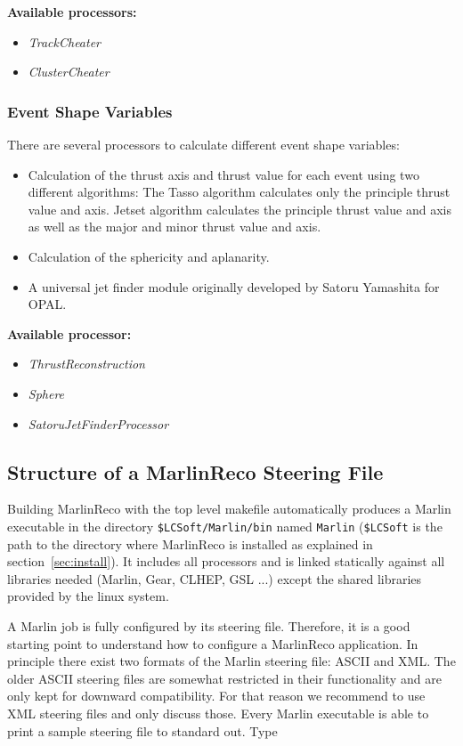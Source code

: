 {\bf Available processors:}
\begin{itemize}
\item {\em TrackCheater}
\item {\em ClusterCheater}
\end{itemize}

\subsubsection{Event Shape Variables}

There are several processors to calculate different event shape variables:

\begin{itemize}
\item Calculation of the thrust axis and thrust value for each event using two
      different algorithms:
      The Tasso algorithm calculates only the principle thrust value and axis.
      Jetset algorithm calculates the principle thrust value and axis
      as well as the major and minor thrust value and axis.
\item Calculation of the sphericity and aplanarity.
\item A universal jet finder module originally developed by Satoru Yamashita for
   OPAL.
\end{itemize}

{\bf Available processor:}
\begin{itemize}
\item {\em ThrustReconstruction}
\item {\em Sphere}
\item {\em SatoruJetFinderProcessor}
\end{itemize}

\subsection{Structure of a MarlinReco Steering File}

Building MarlinReco with the top level makefile automatically produces a
Marlin executable in the directory {\tt \$LCSoft/Marlin/bin} named
{\tt Marlin}
({\tt \$LCSoft} is the path to the directory where MarlinReco is installed as
explained in section~\ref{sec:install}).
It includes all processors and is linked statically against all
libraries needed (Marlin, Gear, CLHEP, GSL ...) except the shared libraries
provided by the linux system.

A Marlin job is fully configured by its steering file.
Therefore, it is a good starting point to understand how to configure a
MarlinReco application.
In principle there exist two formats of the Marlin steering file:
ASCII and XML. The older ASCII steering files are somewhat restricted in their
functionality and are only kept for downward compatibility. For that reason
we recommend to use XML steering files and only discuss those.
Every Marlin executable is
able to print a sample steering file to standard out. Type

